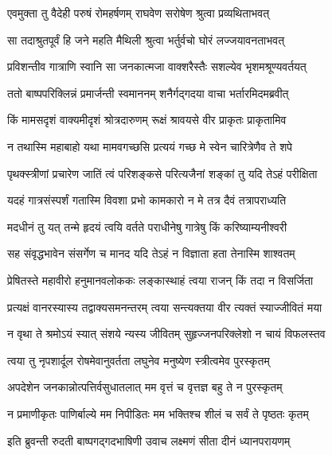
\twolineshloka
{एवमुक्ता तु वैदेही परुषं रोमहर्षणम्}
{राघवेण सरोषेण श्रुत्वा प्रव्यथिताभवत्} %

\twolineshloka
{सा तदाश्रुतपूर्वं हि जने महति मैथिली}
{श्रुत्वा भर्तुर्वचो घोरं लज्जयावनताभवत्} %

\twolineshloka
{प्रविशन्तीव गात्राणि स्वानि सा जनकात्मजा}
{वाक्शरैस्तैः सशल्येव भृशमश्रूण्यवर्तयत्} %

\twolineshloka
{ततो बाष्पपरिक्लिन्नं प्रमार्जन्ती स्वमाननम्}
{शनैर्गद्गदया वाचा भर्तारमिदमब्रवीत्} %

\twolineshloka
{किं मामसदृशं वाक्यमीदृशं श्रोत्रदारुणम्}
{रूक्षं श्रावयसे वीर प्राकृतः प्राकृतामिव} %

\twolineshloka
{न तथास्मि महाबाहो यथा मामवगच्छसि}
{प्रत्ययं गच्छ मे स्वेन चारित्रेणैव ते शपे} %

\twolineshloka
{पृथक्स्त्रीणां प्रचारेण जातिं त्वं परिशङ्कसे}
{परित्यजैनां शङ्कां तु यदि तेऽहं परीक्षिता} %

\twolineshloka
{यदहं गात्रसंस्पर्शं गतास्मि विवशा प्रभो}
{कामकारो न मे तत्र दैवं तत्रापराध्यति} %

\twolineshloka
{मदधीनं तु यत् तन्मे हृदयं त्वयि वर्तते}
{पराधीनेषु गात्रेषु किं करिष्याम्यनीश्वरी} %

\twolineshloka
{सह संवृद्धभावेन संसर्गेण च मानद}
{यदि तेऽहं न विज्ञाता हता तेनास्मि शाश्वतम्} %

\twolineshloka
{प्रेषितस्ते महावीरो हनुमानवलोककः}
{लङ्कास्थाहं त्वया राजन् किं तदा न विसर्जिता} %

\twolineshloka
{प्रत्यक्षं वानरस्यास्य तद्वाक्यसमनन्तरम्}
{त्वया सन्त्यक्तया वीर त्यक्तं स्याज्जीवितं मया} %

\twolineshloka
{न वृथा ते श्रमोऽयं स्यात् संशये न्यस्य जीवितम्}
{सुहृज्जनपरिक्लेशो न चायं विफलस्तव} %

\twolineshloka
{त्वया तु नृपशार्दूल रोषमेवानुवर्तता}
{लघुनेव मनुष्येण स्त्रीत्वमेव पुरस्कृतम्} %

\twolineshloka
{अपदेशेन जनकान्नोत्पत्तिर्वसुधातलात्}
{मम वृत्तं च वृत्तज्ञ बहु ते न पुरस्कृतम्} %

\twolineshloka
{न प्रमाणीकृतः पाणिर्बाल्ये मम निपीडितः}
{मम भक्तिश्च शीलं च सर्वं ते पृष्ठतः कृतम्} %

\twolineshloka
{इति ब्रुवन्ती रुदती बाष्पगद्गदभाषिणी}
{उवाच लक्ष्मणं सीता दीनं ध्यानपरायणम्} %

